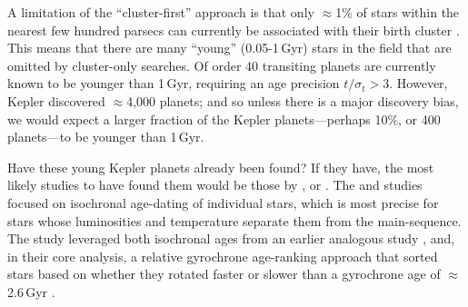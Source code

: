 \documentclass[11pt,twocolumn,tighten]{aastex63}
\begin{document}
A limitation of the ``cluster-first'' approach is that only
$\approx$1\% of stars within the nearest few hundred parsecs can
currently be associated with their birth cluster
\citep[e.g.][]{Zari_2018,CantatGaudin_2020,Kounkel_2020,Kerr_2021}.
This means that there are many ``young'' (0.05-1\,Gyr) stars in the
field that are omitted by cluster-only searches.
Of order 40 transiting planets are currently known to be younger than
1\,Gyr, requiring an age precision $t/\sigma_t > 3$.
However, Kepler discovered
$\approx$4{,}000 planets; and so unless there is a major discovery
bias, we would expect a larger fraction of the Kepler
planets---perhaps 10\%, or 400 planets---to be younger than 1\,Gyr.


Have these young Kepler planets already been found?  If they have, the
most likely studies to have found them would be those by
\citet{Berger_2020b_rpage}, \citet{David_2021} or
\citet{Petigura_2022}.  The \citeauthor{Berger_2020b_rpage} and
\citeauthor{Petigura_2022} studies focused on
isochronal age-dating of individual stars, which is most precise 
for stars whose luminosities and temperature separate them from the
main-sequence.  The \citeauthor{David_2021} study leveraged both isochronal
ages from an earlier analogous study
\citep{Fulton_Petigura_2018_cks_vii}, and, in their core analysis, a
relative gyrochrone age-ranking approach that sorted stars based on
whether they rotated faster or slower than a gyrochrone age of
$\approx$2.6\,Gyr \citep{Meibom_2015,Curtis_2020}.
\end{document}
